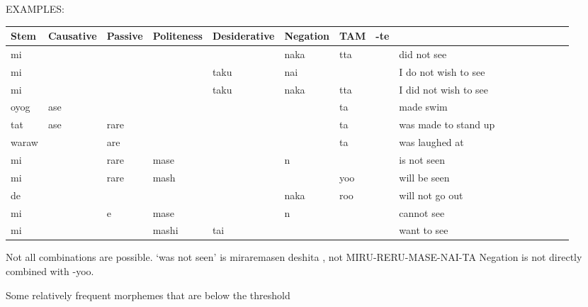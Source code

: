 EXAMPLES:

\begin{tabular}{llllllll|llllllll}
Stem & Causative & Passive & Politeness & Desiderative & Negation & TAM & -te & \\ \hline
mi &          &       &            &          & naka     & tta &    & did not see \cite[153]{vaccari1938complete}\\
mi &          &       &            & taku     & nai      &     &     & I do not wish to see \cite[98]{vaccari1938complete} \\
mi &          &       &            & taku     & naka    & tta  &      & I did not wish to see \cite[98]{vaccari1938complete} \\
oyog & ase    &       &            &          &         & ta    &     & made swim \\
tat & ase     & rare  &            &          &         & ta    &     & was made to stand up \cite[396]{kaiser2013japanese} \\
waraw  &       & are  &            &           &         & ta    &    & was laughed at \cite[384]{kaiser2013japanese} \\
mi     &       & rare & mase       &          & n        &      &     & is not seen \cite[337]{vaccari1938complete} \\
mi     &       & rare & mash      &           &          & yoo  &    & will be seen \cite[337]{vaccari1938complete} \\
de     &       &     &            &           & naka     & roo  &    & will not go out \cite[170]{vaccari1938complete} \\
mi     &       & e   & mase       &           & n        &      &    & cannot see \cite[349]{vaccari1938complete} \\
mi     &       &     & mashi      & tai       &          &      &    & want to see
\end{tabular}


Not all combinations are possible. 
`was not seen' is miraremasen deshita \cite[337]{vaccari1938complete}, not MIRU-RERU-MASE-NAI-TA
Negation is not directly combined with -yoo.

Some relatively frequent morphemes that are below the threshold

